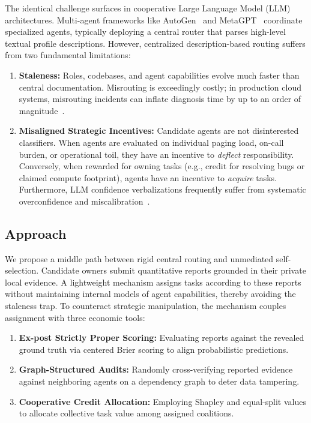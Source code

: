 \documentclass{article}
\theoremstyle{definition}
\begin{document}
The identical challenge surfaces in cooperative Large Language Model (LLM) architectures. Multi-agent frameworks like AutoGen~\cite{wu2023autogen} and MetaGPT~\cite{hong2024metagpt} coordinate specialized agents, typically deploying a central router that parses high-level textual profile descriptions. However, centralized description-based routing suffers from two fundamental limitations:
\begin{enumerate}
    \item \textbf{Staleness:} Roles, codebases, and agent capabilities evolve much faster than central documentation. Misrouting is exceedingly costly; in production cloud systems, misrouting incidents can inflate diagnosis time by up to an order of magnitude~\cite{gao2020scouts}.
    \item \textbf{Misaligned Strategic Incentives:} Candidate agents are not disinterested classifiers. When agents are evaluated on individual paging load, on-call burden, or operational toil, they have an incentive to \emph{deflect} responsibility. Conversely, when rewarded for owning tasks (e.g., credit for resolving bugs or claimed compute footprint), agents have an incentive to \emph{acquire} tasks. Furthermore, LLM confidence verbalizations frequently suffer from systematic overconfidence and miscalibration~\cite{xiong2024can}.
\end{enumerate}

\subsection{Approach}
We propose a middle path between rigid central routing and unmediated self-selection. Candidate owners submit quantitative reports grounded in their private local evidence. A lightweight mechanism assigns tasks according to these reports without maintaining internal models of agent capabilities, thereby avoiding the staleness trap. To counteract strategic manipulation, the mechanism couples assignment with three economic tools:
\begin{enumerate}
    \item \textbf{Ex-post Strictly Proper Scoring:} Evaluating reports against the revealed ground truth via centered Brier scoring to align probabilistic predictions.
    \item \textbf{Graph-Structured Audits:} Randomly cross-verifying reported evidence against neighboring agents on a dependency graph to deter data tampering.
    \item \textbf{Cooperative Credit Allocation:} Employing Shapley and equal-split values to allocate collective task value among assigned coalitions.
\end{enumerate}
\end{document}
